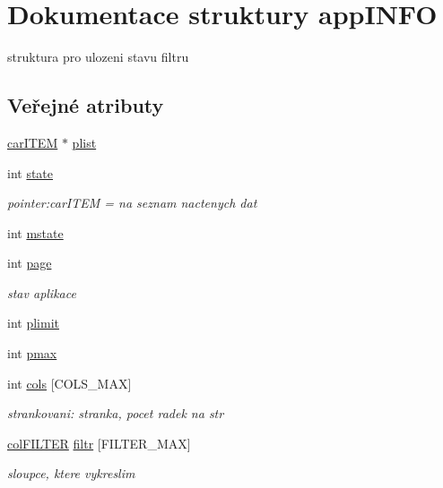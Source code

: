 \hypertarget{structappINFO}{
\section{\-Dokumentace struktury app\-I\-N\-F\-O}
\label{d3/d7d/structappINFO}
}


struktura pro ulozeni stavu filtru  


\subsection*{\-Veřejné atributy}
\begin{DoxyCompactItemize}
\item 
\hyperlink{io_8h_ab185ce476fadf726e050c47e0ca3e717}{car\-I\-T\-E\-M} $\ast$ \hyperlink{structappINFO_a7a03b4aba262b9a92ba934319c2d0c0e}{plist}
\item 
int \hyperlink{structappINFO_a05aebd22f950eef36e212a5d647175dc}{state}
\begin{DoxyCompactList}\small\item\em pointer\-:car\-I\-T\-E\-M = na seznam nactenych dat \end{DoxyCompactList}\item 
int \hyperlink{structappINFO_adfd6385ddf12d07eae63c0f6c2e35f56}{mstate}
\item 
int \hyperlink{structappINFO_a3e71923aa543da9b106e9959dc4c67e7}{page}
\begin{DoxyCompactList}\small\item\em stav aplikace \end{DoxyCompactList}\item 
int \hyperlink{structappINFO_afff0bc6ce594cc74345e3641a0522ab8}{plimit}
\item 
int \hyperlink{structappINFO_a24c25ecb17d321f5cbb73df0a25fcf78}{pmax}
\item 
int \hyperlink{structappINFO_ad97cbcd08e92d265bceb5fd0a2e0e184}{cols} \mbox{[}\-C\-O\-L\-S\-\_\-\-M\-A\-X\mbox{]}
\begin{DoxyCompactList}\small\item\em strankovani\-: stranka, pocet radek na str \end{DoxyCompactList}\item 
\hyperlink{structcolFILTER}{col\-F\-I\-L\-T\-E\-R} \hyperlink{structappINFO_a23c6e7c58add373c270611f2fd0bdca1}{filtr} \mbox{[}\-F\-I\-L\-T\-E\-R\-\_\-\-M\-A\-X\mbox{]}
\begin{DoxyCompactList}\small\item\em sloupce, ktere vykreslim \end{DoxyCompactList}\item 

\end{DoxyCompactItemize}
